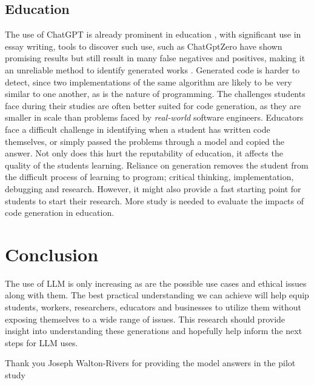 \documentclass[manuscript,screen,review,sigconf]{acmart}
\begin{document}
\subsection{Education}
The use of ChatGPT is already prominent in education \cite{GPTEducationImpact}, with significant use in essay writing, tools to discover such use, such as ChatGptZero \cite{tian2023gptzero} have shown promising results but still result in many false negatives and positives, making it an unreliable method to identify generated works \cite{farrokhhabibzadeh_2023}. Generated code is harder to detect, since two implementations of the same algorithm are likely to be very similar to one another, as is the nature of programming. The challenges students face during their studies are often better suited for code generation, as they are smaller in scale than problems faced by \textit{real-world} software engineers. Educators face a difficult challenge in identifying when a student has written code themselves, or simply passed the problems through a model and copied the answer. Not only does this hurt the reputability of education, it affects the quality of the students learning. Reliance on generation removes the student from the difficult process of learning to program; critical thinking, implementation, debugging and research. However, it might also provide a fast starting point for students to start their research. More study is needed to evaluate the impacts of code generation in education.

\section{Conclusion}
The use of LLM is only increasing as are the possible use cases and ethical issues along with them. The best practical understanding we can achieve will help equip students, workers, researchers, educators and businesses to utilize them without exposing themselves to a wide range of issues. This research should provide insight into understanding these generations and hopefully help inform the next steps for LLM uses.

\begin{acks}
Thank you Joseph Walton-Rivers for providing the model answers in the pilot study
\end{acks}
\end{document}

